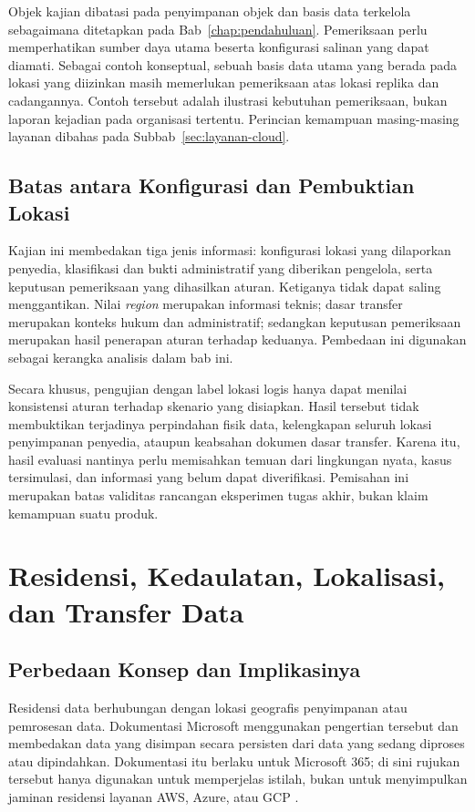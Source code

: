 Objek kajian dibatasi pada penyimpanan objek dan basis data terkelola sebagaimana ditetapkan pada Bab~\ref{chap:pendahuluan}. Pemeriksaan perlu memperhatikan sumber daya utama beserta konfigurasi salinan yang dapat diamati. Sebagai contoh konseptual, sebuah basis data utama yang berada pada lokasi yang diizinkan masih memerlukan pemeriksaan atas lokasi replika dan cadangannya. Contoh tersebut adalah ilustrasi kebutuhan pemeriksaan, bukan laporan kejadian pada organisasi tertentu. Perincian kemampuan masing-masing layanan dibahas pada Subbab~\ref{sec:layanan-cloud}.

\subsection{Batas antara Konfigurasi dan Pembuktian Lokasi}
Kajian ini membedakan tiga jenis informasi: konfigurasi lokasi yang dilaporkan penyedia, klasifikasi dan bukti administratif yang diberikan pengelola, serta keputusan pemeriksaan yang dihasilkan aturan. Ketiganya tidak dapat saling menggantikan. Nilai \textit{region} merupakan informasi teknis; dasar transfer merupakan konteks hukum dan administratif; sedangkan keputusan pemeriksaan merupakan hasil penerapan aturan terhadap keduanya. Pembedaan ini digunakan sebagai kerangka analisis dalam bab ini.

Secara khusus, pengujian dengan label lokasi logis hanya dapat menilai konsistensi aturan terhadap skenario yang disiapkan. Hasil tersebut tidak membuktikan terjadinya perpindahan fisik data, kelengkapan seluruh lokasi penyimpanan penyedia, ataupun keabsahan dokumen dasar transfer. Karena itu, hasil evaluasi nantinya perlu memisahkan temuan dari lingkungan nyata, kasus tersimulasi, dan informasi yang belum dapat diverifikasi. Pemisahan ini merupakan batas validitas rancangan eksperimen tugas akhir, bukan klaim kemampuan suatu produk.

\section{Residensi, Kedaulatan, Lokalisasi, dan Transfer Data}
\label{sec:konsep-residensi}
\subsection{Perbedaan Konsep dan Implikasinya}
Residensi data berhubungan dengan lokasi geografis penyimpanan atau pemrosesan data. Dokumentasi Microsoft menggunakan pengertian tersebut dan membedakan data yang disimpan secara persisten dari data yang sedang diproses atau dipindahkan. Dokumentasi itu berlaku untuk Microsoft 365; di sini rujukan tersebut hanya digunakan untuk memperjelas istilah, bukan untuk menyimpulkan jaminan residensi layanan AWS, Azure, atau GCP \autocite{msresidency2026}.

